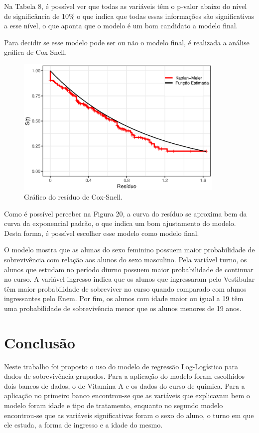 \documentclass[a4paper,12pt]{article}
\newcommand*\NewPage{\newpage\null\newpage}
\begin{document}
Na Tabela 8, é possível ver que todas as variáveis têm o p-valor abaixo do nível de significância de 10\% o que indica que todas essas informações são significativas a esse nível, o que aponta que o modelo é um bom candidato a modelo final. 

Para decidir se esse modelo pode ser ou não o modelo final, é realizada a análise gráfica de Cox-Snell.

\begin{figure}[H]
\centering
\includegraphics[width=10cm]{res_quim}
\caption{Gráfico do resíduo de Cox-Snell.}
\end{figure}

Como é possível perceber na Figura 20, a curva do resíduo se aproxima bem da curva da exponencial padrão, o que indica um bom ajustamento do modelo. Desta forma, é possível escolher esse modelo como modelo final.

O modelo mostra que as alunas do sexo feminino possuem maior probabilidade de sobrevivência com relação aos alunos do sexo masculino. Pela variável turno, os alunos que estudam no período diurno possuem maior probabilidade de continuar no curso. A variável ingresso indica que os alunos que ingressaram pelo Vestibular têm maior probabilidade de sobreviver no curso quando comparado com alunos ingressantes pelo Enem. Por fim, os alunos com idade maior ou igual a 19 têm uma probabilidade de sobrevivência menor que os alunos menores de 19 anos.


\NewPage

\section{Conclusão}

Neste trabalho foi proposto o uso do modelo de regressão Log-Logístico para dados de sobrevivência grupados. Para a aplicação do modelo foram escolhidos dois bancos de dados, o de Vitamina A e os dados do curso de química. Para a aplicação no primeiro banco encontrou-se que as variáveis que explicavam bem o modelo foram idade e tipo de tratamento, enquanto no segundo modelo encontrou-se que as variáveis significativas foram o sexo do aluno, o turno em que ele estuda, a forma de ingresso e a idade do mesmo.
\end{document}
